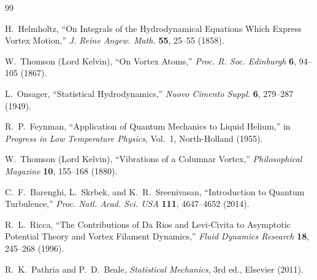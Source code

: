 \documentclass[pdflatex,sn-mathphys-num]{sn-jnl}
\begin{document}
            \begin{thebibliography}{99}

                H.~Helmholtz,
                ``On Integrals of the Hydrodynamical Equations Which Express Vortex Motion,''
                \emph{J. Reine Angew. Math.} \textbf{55}, 25--55 (1858).

                W.~Thomson (Lord Kelvin),
                ``On Vortex Atoms,''
                \emph{Proc. R. Soc. Edinburgh} \textbf{6}, 94--105 (1867).

                L.~Onsager,
                ``Statistical Hydrodynamics,''
                \emph{Nuovo Cimento Suppl.} \textbf{6}, 279--287 (1949).

                R.~P.~Feynman,
                ``Application of Quantum Mechanics to Liquid Helium,''
                in \emph{Progress in Low Temperature Physics}, Vol.~1,
                North-Holland (1955).

                W.~Thomson (Lord Kelvin),
                ``Vibrations of a Columnar Vortex,''
                \emph{Philosophical Magazine} \textbf{10}, 155--168 (1880).

                C.~F.~Barenghi, L.~Skrbek, and K.~R.~Sreenivasan,
                ``Introduction to Quantum Turbulence,''
                \emph{Proc. Natl. Acad. Sci. USA} \textbf{111}, 4647--4652 (2014).

                R.~L.~Ricca,
                ``The Contributions of Da Rios and Levi-Civita to Asymptotic Potential Theory and Vortex Filament Dynamics,''
                \emph{Fluid Dynamics Research} \textbf{18}, 245--268 (1996).

                R.~K.~Pathria and P.~D.~Beale,
                \emph{Statistical Mechanics}, 3rd ed.,
                Elsevier (2011).

            \end{thebibliography}
\end{document}
